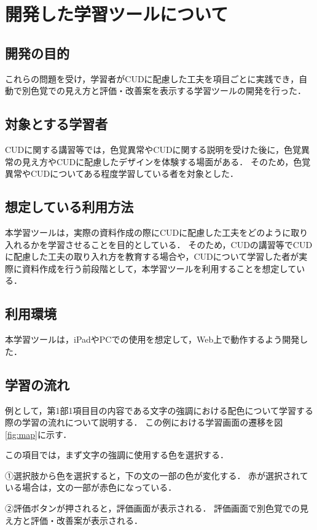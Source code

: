 \section{開発した学習ツールについて}

\subsection{開発の目的}
これらの問題を受け，学習者がCUDに配慮した工夫を項目ごとに実践でき，自動で別色覚での見え方と評価・改善案を表示する学習ツールの開発を行った．

\subsection{対象とする学習者}
CUDに関する講習等では，色覚異常やCUDに関する説明を受けた後に，色覚異常の見え方やCUDに配慮したデザインを体験する場面がある．
そのため，色覚異常やCUDについてある程度学習している者を対象とした．

\subsection{想定している利用方法}
本学習ツールは，実際の資料作成の際にCUDに配慮した工夫をどのように取り入れるかを学習させることを目的としている．
そのため，CUDの講習等でCUDに配慮した工夫の取り入れ方を教育する場合や，CUDについて学習した者が実際に資料作成を行う前段階として，本学習ツールを利用することを想定している．

\subsection{利用環境}
本学習ツールは，iPadやPCでの使用を想定して，Web上で動作するよう開発した．


\clearpage

\subsection{学習の流れ}
例として，第1部1項目目の内容である文字の強調における配色について学習する際の学習の流れについて説明する．
この例における学習画面の遷移を図\ref{fig:map}に示す．

この項目では，まず文字の強調に使用する色を選択する．

①選択肢から色を選択すると，下の文の一部の色が変化する．
赤が選択されている場合は，文の一部が赤色になっている．

②評価ボタンが押されると，評価画面が表示される．
評価画面で別色覚での見え方と評価・改善案が表示される．

